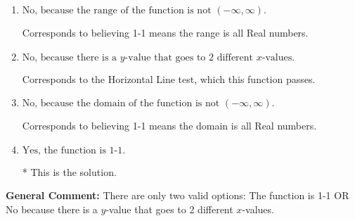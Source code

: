 \documentclass{extbook}[14pt]
\begin{document}
\begin{enumerate}
{\begin{enumerate}[label=\Alph*.]
Corresponds to the Vertical Line test, which checks if an expression is a function.
\item \( \text{No, because the range of the function is not $(-\infty, \infty)$.} \)

Corresponds to believing 1-1 means the range is all Real numbers.
\item \( \text{No, because there is a $y$-value that goes to 2 different $x$-values.} \)

Corresponds to the Horizontal Line test, which this function passes.
\item \( \text{No, because the domain of the function is not $(-\infty, \infty)$.} \)

Corresponds to believing 1-1 means the domain is all Real numbers.
\item \( \text{Yes, the function is 1-1.} \)

* This is the solution.
\end{enumerate}

\textbf{General Comment:} There are only two valid options: The function is 1-1 OR No because there is a $y$-value that goes to 2 different $x$-values.
}
\end{enumerate}
\end{document}

